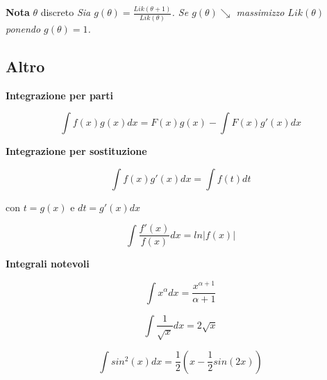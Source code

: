 \documentclass[a4paper,9pt]{article}
\begin{document}
\begin{multicols*}{3}
\bigskip

\textbf{Nota} $\theta$ discreto \textit{
Sia $g(\theta) = \frac{Lik(\theta+1)}{Lik(\theta)}$. Se $g(\theta) \searrow$ massimizzo $Lik(\theta)$ ponendo $g(\theta) = 1$.
}

\bigskip

\subsection*{Altro}

\textbf{Integrazione per parti}

$$\int f(x)g(x) dx = F(x)g(x) - \int F(x) g'(x)dx$$

\textbf{Integrazione per sostituzione}

$$\int f(x)g'(x) dx = \int f(t) dt$$

con $t = g(x)$ e $dt = g'(x)dx$

$$\int \frac{f'(x)}{f(x)} dx = ln|f(x)|$$

\bigskip

\textbf{Integrali notevoli}

$$\int x^\alpha dx = \frac{x^{\alpha+1}}{\alpha+1}$$

$$\int \frac{1}{\sqrt{x}} dx = 2\sqrt{x}$$

$$\int sin^2(x) dx = \frac{1}{2} (x - \frac{1}{2} sin(2x))$$





\end{multicols*}
\end{document}
